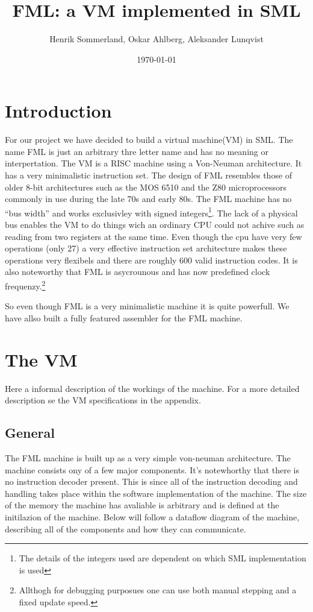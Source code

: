 \documentclass{article}
\title{FML: a VM implemented in SML}
\author{Henrik Sommerland, Oskar Ahlberg, Aleksander Lunqvist}
\date{\today}
\begin{document}
\maketitle
\section{Introduction}
For our project we have decided to build a virtual 
machine(VM) in SML.
The name FML is just an arbitrary thre letter name and has no meaning or interpertation.
The VM is a RISC machine using a Von-Neuman architecture. It has a very
minimalistic instruction set. The design of FML resembles those of older 8-bit
architectures such as the MOS 6510 and the Z80 microprocessors commonly in use
during the late 70s and early 80s. The FML machine has no ``bus width'' and 
works exclusivley with signed integers\footnote{The details of the integers
used are dependent on which SML implementation is used}. The lack of a physical
bus enables the VM to do things wich an ordinary CPU could not achive such as
reading from two registers at the same time. Even though
the cpu have very few operations (only 27) a very effective instruction set architecture
makes these operations very flexibels and there are roughly 600 valid    
instruction codes. It is also noteworthy that FML is asycrounous and has now
predefined clock frequenzy.\footnote{Allthogh for debugging purposues one can
use both manual stepping and a fixed update speed.}

So even though FML is a very minimalistic machine it is quite powerfull.
We have allso built a fully featured assembler for the FML machine.
\section{The VM}
Here a informal description of the workings of the machine. For a more detailed
description se the VM specifications in the appendix.
\subsection{General}
The FML machine is built up as a very simple von-neuman architecture. The
machine consists ony of a few major components. It's notewhorthy that there is
no instruction decoder present. This is since all of the instruction decoding
and handling takes place within the software implementation of the machine.
The size of the memory the machine has avaliable is arbitrary and is defined at
the initilazion of the machine. Below will follow a dataflow diagram of the
machine, describing all of the components and how they can communicate.  
\end{document}
